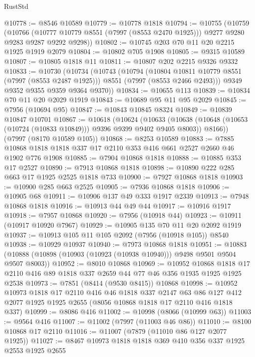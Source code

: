 \begin{lexlean}{RustStd}
\begin{coremodule}
{\begin{coremodule}
{{{{{{{{{{{{{{{{{{{{{{{{{{{{{{{{{{{{{{{{{{{@10778 := @8546 @10589
@10779 := @10778 @1818
@10794 := @10755
    (@10759
      (@10766
        (@10777 @10779 @8551 (@7997 (@8553 @2470 @1925)))
        @9277
        @9280
        @9283
        @9287
        @9292
        @9298))
@10802 := @10745 @203 @70 @11 @20 @2215 @1925 @1919 @2079
@10804 := @10802 @705 @1908
@10805 := @9315 @10589
@10807 := @10805 @1818 @11
@10811 := @10807 @202 @2215 @9326 @9332
@10833 := @10730
    (@10734
      (@10743
        (@10794
          (@10804 @10811 @10779 @8551 (@7997 (@8553 @2487 @1925)))
          @8551
          (@7997 (@8553 @2466 @2493)))
        @9349
        @9352
        @9355
        @9359
        @9364
        @9370))
@10834 := @10655 @113
@10839 := @10834 @70 @11 @20 @2029 @1919
@10843 := @10689 @95 @11 @95 @2029
@10845 := @7956 (@10694 @95)
@10847 := @10843 @10845 @8324
@10849 := @10839 @10847 @10701
@10867 := @10618
    (@10624
      (@10633
        (@10638 (@10648 (@10653 (@10724 (@10833 @10849))) @9396 @9399 @9402 @9405 @8003))
        @8166))
    (@7997 (@8170 @10589 @105))
@10868 := @8253 @10589
@10883 := @7885 @10868 @1818 @1818 @337 @17 @2110 @353 @416 @661 @2527 @2660 @46 @1902 @776 @1908
@10885 := @7904 @10868 @1818
@10888 := @10885 @353 @17 @2527
@10890 := @7913 @10868 @1818
@10898 := @10890 @222 @285 @663 @17 @1925 @2525 @1818 @733
@10900 := @7927 @10868 @1818
@10903 := @10900 @285 @663 @2525
@10905 := @7936 @10868 @1818
@10906 := @10905 @68
@10911 := @10906 @137 @49 @333 @1917 @2339
@10913 := @7948 @10868 @1818
@10916 := @10913 @44 @49 @44
@10917 := @10916 @1917
@10918 := @7957 @10868
@10920 := @7956 (@10918 @44)
@10923 := @10911 (@10917 @10920 @7967)
@10929 := @10905 @135 @70 @11 @20 @2092 @1919
@10937 := @10913 @105 @11 @105 @2092 (@7956 (@10918 @105)) @8540
@10938 := @10929 @10937
@10940 := @7973 @10868 @1818
@10951 := @10883 (@10888 (@10898 (@10903 (@10923 (@10938 @10940))) @9498 @9501 @9504 @9507 @8003))
@10952 := @8010 @10868
@10969 := @10952
    @10868
    @1818
    @17
    @2110
    @416
    @89
    @1818
    @337
    @2659
    @44
    @77
    @46
    @356
    @1935
    @1925
    @1925
    @2538
@10973 := @7851 (@8414 (@9530 @8415)) @10868
@10998 := @10952
    @10973
    @1818
    @17
    @2110
    @416
    @46
    @1818
    @337
    @2147
    @63
    @86
    @127
    @412
    @2077
    @1925
    @1925
    @2655
    (@8056 @10868 @1818 @17 @2110 @416 @1818 @337)
@10999 := @8086 @416
@11002 := @10998 (@8066 (@10999 @63))
@11003 := @9564 @416
@11007 := @11002 (@7997 (@11003 @46 @86))
@11010 := @8100 @10868 @17 @2110
@11016 := @11007 (@7879 (@11010 @86 @127 @2077 @1925))
@11027 := @8467 @10973 @1818 @1818 @369 @410 @356 @337 @1925 @2553 @1925 @2655
}}}}}}}}}}}}}}}}}}}}}}}}}}}}}}}}}}}}}}}}}}}
\end{coremodule}}
\end{coremodule}
\end{lexlean}
